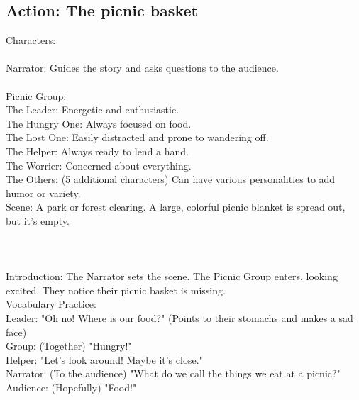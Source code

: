 \documentclass[]{article} %
\begin{document}
	
\subsection{Action: The picnic basket}

Characters:\\
\\
Narrator: Guides the story and asks questions to the audience.\\
\\
Picnic Group:\\
The Leader: Energetic and enthusiastic.\\
The Hungry One: Always focused on food.\\
The Lost One: Easily distracted and prone to wandering off.\\
The Helper: Always ready to lend a hand.\\
The Worrier: Concerned about everything.\\
The Others: (5 additional characters) Can have various personalities to add humor or variety.\\
Scene: A park or forest clearing. A large, colorful picnic blanket is spread out, but it's empty.\\
\\
\iffalse\\
Props (Optional):\\
\\
A large, empty picnic basket\\
Pictures or drawings of food items (fruits, sandwiches, etc.)\\
Signs with simple directions (e.g., "This way," "That way")\\
A map (very basic)\\
Sketch:\\
\fi\\
\\
Introduction: The Narrator sets the scene. The Picnic Group enters, looking excited. They notice their picnic basket is missing.\\
Vocabulary Practice:\\
Leader: "Oh no! Where is our food?" (Points to their stomachs and makes a sad face)\\
Group: (Together) "Hungry!"\\
Helper: "Let's look around! Maybe it's close."\\
Narrator: (To the audience) "What do we call the things we eat at a picnic?"\\
Audience: (Hopefully) "Food!"\\
\end{document}
